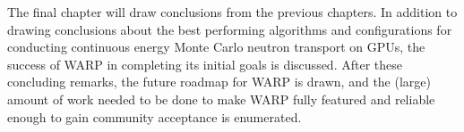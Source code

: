 The final chapter will draw conclusions from the previous chapters.  In addition to drawing conclusions about the best performing algorithms and configurations for conducting continuous energy Monte Carlo neutron transport on GPUs, the success of WARP in completing its initial goals is discussed.  After these concluding remarks, the future roadmap for WARP is drawn, and the (large) amount of work needed to be done to make WARP fully featured and reliable enough to gain community acceptance is enumerated.





